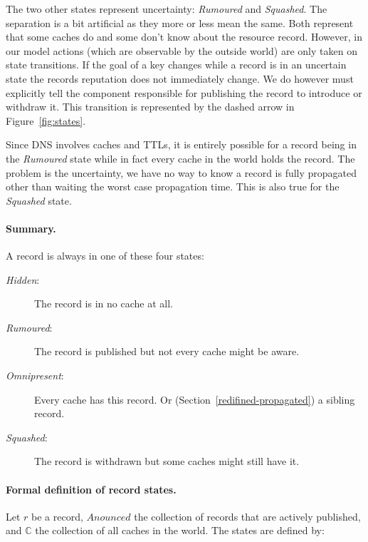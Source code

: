 \documentclass[twoside,english, a4paper]{article}
\begin{document}
The two other states represent uncertainty: \emph{Rumoured} and \emph
{Squashed}. The separation is a bit artificial as they more or less 
mean the same. Both represent that some caches do and some don't 
know about the resource record. However, in our model actions (which 
are observable by the outside world) are only taken on state 
transitions. If the goal of a key changes while a record is in an 
uncertain state the records reputation does not immediately change. We 
do however must explicitly tell the component responsible for 
publishing the record to introduce or withdraw it. This transition 
is represented by the dashed arrow in Figure~\ref{fig:states}.

Since DNS involves caches and TTLs, it is entirely possible for a 
record being in the \emph{Rumoured} state while in fact every cache 
in the world holds the record. The problem is the uncertainty, we have
no way to know a record is fully propagated other than waiting the
worst case propagation time. This is also true for the \emph{Squashed}
state.

\paragraph{Summary.} A record is always in one of these four states:

\begin{description}
       \item[\emph{Hidden}:] 		
			The record is in no cache at all.
       \item[\emph{Rumoured}:] 		
			The record is published but not every cache might be aware.
       \item[\emph{Omnipresent}:]
			Every cache has this record.
			Or (Section~\ref{redifined-propagated}) a
			sibling record.
       \item[\emph{Squashed}:]
			The record is withdrawn but some caches might still have it.
\end{description} 

\paragraph{Formal definition of record states.} Let $r$ be a record, $Anounced$ the 
collection of records that are actively published, and $\mathbb{C}$
the collection of all caches in the world. The states are defined by:
\end{document}
